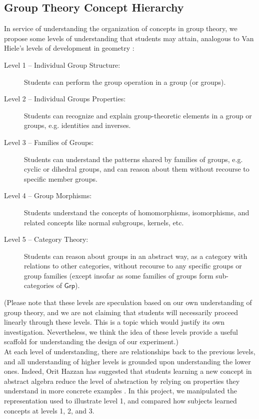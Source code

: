 \documentclass[11pt]{article}
\begin{document}
\subsection{Group Theory Concept Hierarchy} %
In service of understanding the organization of concepts in group theory, we propose some levels of understanding that students may attain, analogous to Van Hiele's levels of development in geometry \cite{Burger1986}:
\begin{description}
\item[Level 1 -- Individual Group Structure:] Students can perform the group operation in a group (or groups).
\item[Level 2 -- Individual Groups Properties:] Students can recognize and explain group-theoretic elements in a group or groups, e.g. identities and inverses.
\item[Level 3 -- Families of Groups:] Students can understand the patterns shared by families of groups, e.g. cyclic or dihedral groups, and can reason about them without recourse to specific member groups.
\item[Level 4 -- Group Morphisms:] Students understand the concepts of homomorphisms, isomorphisms, and related concepts like normal subgroups, kernels, etc.
\item[Level 5 -- Category Theory:] Students can reason about groups in an abstract way, as a category with relations to other categories, without recourse to any specific groups or group families (except insofar as some families of groups form sub-categories of $\mathsf{Grp}$).
\end{description}
(Please note that these levels are speculation based on our own understanding of group theory, and we are not claiming that students will necessarily proceed linearly through these levels. This is a topic which would justify its own investigation. Nevertheless, we think the idea of these levels provide a useful scaffold for understanding the design of our experiment.) \\[11pt]
At each level of understanding, there are relationships back to the previous levels, and all understanding of higher levels is grounded upon understanding the lower ones. Indeed, Orit Hazzan has suggested that students learning a new concept in abstract algebra reduce the level of abstraction by relying on properties they understand in more concrete examples \cite{Hazzan1999}. In this project, we manipulated the representation used to illustrate level 1, and compared how subjects learned concepts at levels 1, 2, and 3. 
\end{document}
